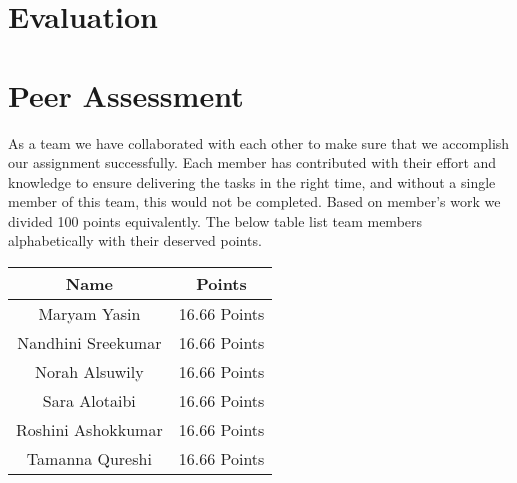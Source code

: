 \documentclass{article}
\begin{document}
\section{Evaluation}
\section{Peer Assessment}
As a team we have collaborated with each other to make sure that we accomplish our assignment successfully.  Each member has contributed with their effort and knowledge to ensure delivering the tasks in the right time, and without a single member of this team, this would not be completed. Based on member’s work we divided 100 points equivalently. The below table list team members alphabetically with their deserved points.  

\begin{center}
\begin{tabular}{ |c|c|} 
\hline
\textbf{Name} & \textbf{Points }  \\ 
\hline
Maryam Yasin  & 16.66 Points    \\ 
\hline
Nandhini Sreekumar  &  16.66 Points   \\ 
\hline

Norah Alsuwily  & 16.66 Points  
 \\ 
\hline
Sara Alotaibi & 16.66 Points  \\ 
\hline
Roshini Ashokkumar  &  16.66 Points \\ 
\hline
Tamanna Qureshi  & 16.66 Points  \\ 
\hline

\end{tabular}
\end{center}
\end{document}
